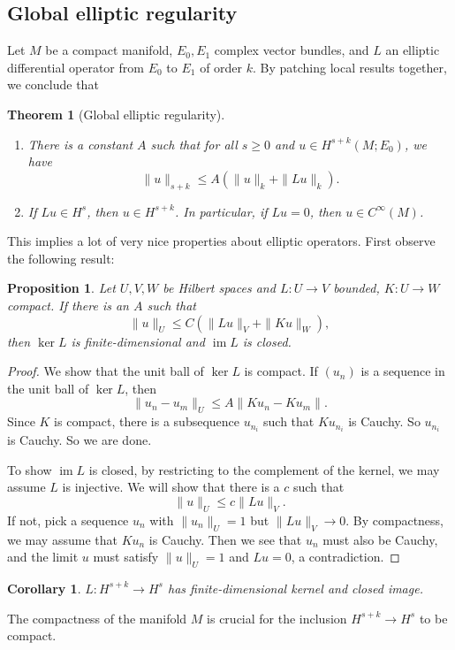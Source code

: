 \documentclass{shortart}
\newtheorem*{prop}{Proposition}
\newtheorem*{thm}{Theorem}
\newtheorem*{cor}{Corollary}
\theoremstyle{definition}
\DeclareMathOperator\im{im}
\begin{document}
\subsection{Global elliptic regularity}
Let $M$ be a compact manifold, $E_0, E_1$ complex vector bundles, and $L$ an elliptic differential operator from $E_0$ to $E_1$ of order $k$. By patching local results together, we conclude that
\begin{thm}[Global elliptic regularity]\leavevmode
  \begin{enumerate}
    \item There is a constant $A$ such that for all $s \geq 0$ and $u \in H^{s + k}(M; E_0)$, we have
      \[
        \|u\|_{s + k} \leq A(\|u\|_k + \|Lu\|_k).
      \]
    \item If $Lu \in H^s$, then $u \in H^{s + k}$. In particular, if $Lu = 0$, then $u \in C^\infty(M)$.\fakeqed
  \end{enumerate}
\end{thm}

This implies a lot of very nice properties about elliptic operators. First observe the following result:
\begin{prop}
  Let $U, V, W$ be Hilbert spaces and $L: U \to V$ bounded, $K: U \to W$ compact. If there is an $A$ such that
  \[
    \|u\|_U \leq C (\|L u\|_V + \|K u\|_W),
  \]
  then $\ker L$ is finite-dimensional and $\im L$ is closed.
\end{prop}

\begin{proof}
  We show that the unit ball of $\ker L$ is compact. If $(u_n)$ is a sequence in the unit ball of $\ker L$, then
  \[
    \|u_n - u_m\|_U \leq A \|Ku_n - Ku_m\|.
  \]
  Since $K$ is compact, there is a subsequence $u_{n_i}$ such that $K u_{n_i}$ is Cauchy. So $u_{n_i}$ is Cauchy. So we are done.

  To show $\im L$ is closed, by restricting to the complement of the kernel, we may assume $L$ is injective. We will show that there is a $c$ such that
  \[
    \|u\|_U \leq c \|L u\|_V.
  \]
  If not, pick a sequence $u_n$ with $\|u_n\|_U = 1$ but $\|L u\|_V \to 0$. By compactness, we may assume that $Ku_n$ is Cauchy. Then we see that $u_n$ must also be Cauchy, and the limit $u$ must satisfy $\|u\|_U = 1$ and $Lu = 0$, a contradiction.
\end{proof}

\begin{cor}
  $L: H^{s + k} \to H^s$ has finite-dimensional kernel and closed image.\fakeqed
\end{cor}
The compactness of the manifold $M$ is crucial for the inclusion $H^{s + k} \to H^s$ to be compact.
\end{document}
